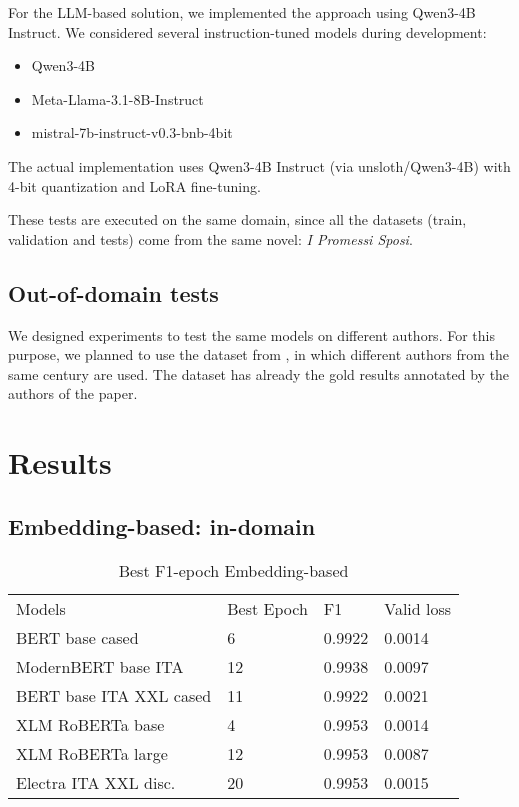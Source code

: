 \documentclass[11pt]{article}
\begin{document}
For the LLM-based solution, we implemented the approach using Qwen3-4B Instruct.
We considered several instruction-tuned models during development:

 \begin{itemize}
 	\item Qwen3-4B
	\item Meta-Llama-3.1-8B-Instruct
	\item mistral-7b-instruct-v0.3-bnb-4bit
\end{itemize}

The actual implementation uses Qwen3-4B Instruct (via unsloth/Qwen3-4B) with 4-bit quantization and LoRA fine-tuning.

These tests are executed on the same domain, since all the datasets (train, validation and tests) 
come from the same novel: \emph{I Promessi Sposi}. 

\subsection{Out-of-domain tests}

We designed experiments to test the same models on different authors.
For this purpose, we planned to use the dataset from \cite{redaelli-sprugnoli-2024-sentence}, in which different authors
from the same century are used.
The dataset has already the gold results annotated by the authors of the paper.

\section{Results}

\subsection{Embedding-based: in-domain}

\begin{table}[]
	\small
	\caption{Best F1-epoch Embedding-based}
	\begin{tabular}{llll}
		Models & Best Epoch & F1 & Valid loss \\
		BERT base cased & 6      & 0.9922        & 0.0014                  \\
		ModernBERT base ITA  & 12      & 0.9938        & 0.0097                  \\
		BERT base ITA XXL cased & 11      & 0.9922        & 0.0021                 \\
		XLM RoBERTa base & 4       & 0.9953        & 0.0014                  \\
		XLM RoBERTa large & 12       & 0.9953       & 0.0087                 \\
		Electra ITA XXL disc. & 20       & 0.9953        & 0.0015                
	\end{tabular}
	\label{t1}
\end{table}
\end{document}
